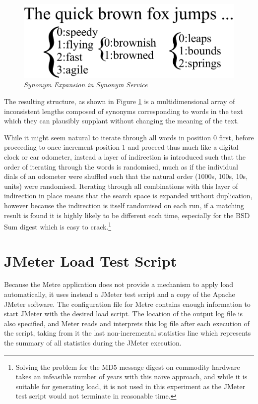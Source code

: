 \documentclass[]{final_report}
\begin{document}
\begin{figure}
\begin{center}
\includegraphics[scale=0.4]{figures/Word_Iterate.pdf}
\caption{\small \sl Synonym Expansion in Synonym Service \label{fig:word_iterate}}
\end{center} 
\end{figure}

The resulting structure, as shown in Figure \ref{fig:word_iterate} is a multidimensional array of inconsistent lengths composed of synonyms corresponding to words in the text which they can plausibly supplant without changing the meaning of the text.

While it might seem natural to iterate through all words in position 0 first, before proceeding to once increment position 1 and proceed thus much like a digital clock or car odometer, instead a layer of indirection is introduced such that the order of iterating through the words is randomised, much as if the individual dials of an odometer were shuffled such that the natural order (1000s, 100s, 10s, units) were randomised. Iterating through all combinations with this layer of indirection in place means that the search space is expanded without duplication, however because the indirection is itself randomised on each run, if a matching result is found it is highly likely to be different each time, especially for the BSD Sum digest which is easy to crack.\footnote{Solving the problem for the MD5 message digest on commodity hardware takes an infeasible number of years with this na\"{\i}ve approach, and while it is suitable for generating load, it is not used in this experiment as the JMeter test script would not terminate in reasonable time.}

\section{JMeter Load Test Script}
Because the Metre application does not provide a mechanism to apply load automatically, it uses instead a JMeter test script and a copy of the Apache JMeter software. The configuration file for Metre contains enough information to start JMeter with the desired load script. The location of the output log file is also specified, and Meter reads and interprets this log file after each execution of the script, taking from it the last non-incremental statistics line which represents the summary of all statistics during the JMeter execution.
\end{document}
